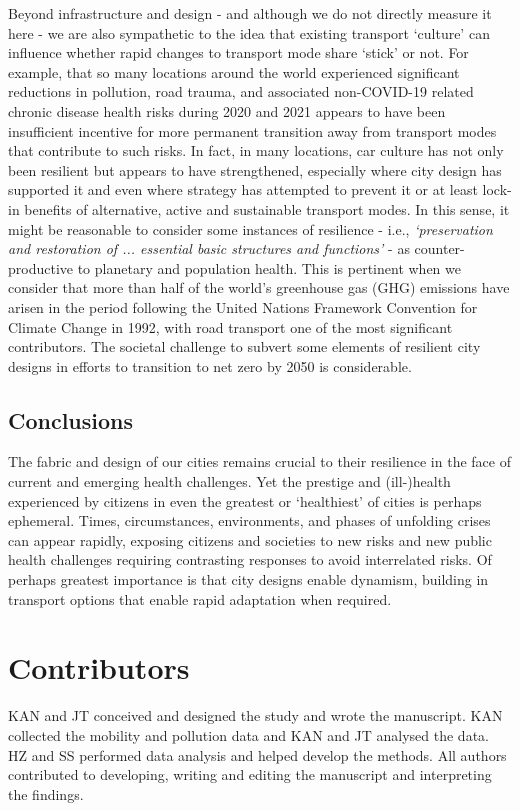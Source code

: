\documentclass[preprint,10pt]{elsarticle} %
\begin{document}
Beyond infrastructure and design - and although we do not directly measure it here - we are also sympathetic to the idea that existing transport `culture' \cite{PATERSON_2000} can influence whether rapid changes to transport mode share `stick' or not. For example, that so many locations around the world experienced significant reductions in pollution, road trauma, and associated non-COVID-19 related chronic disease health risks during 2020 and 2021 appears to have been insufficient incentive for more permanent transition away from transport modes that contribute to such risks. In fact, in many locations, car culture has not only been resilient but appears to have strengthened, especially where city design has supported it and even where strategy has attempted to prevent it or at least lock-in benefits of alternative, active and sustainable transport modes\cite{hunter_city_2024}. In this sense, it might be reasonable to consider some instances of resilience - i.e., \textit{`preservation and restoration of ... essential basic structures and functions'} - as counter-productive to planetary and population health. This is pertinent when we consider that more than half of the world's greenhouse gas (GHG) emissions have arisen in the period following the United Nations Framework Convention for Climate Change in 1992\cite{bashmakov2022climate}, with road transport one of the most significant contributors. The societal challenge to subvert some elements of resilient city designs in efforts to transition to net zero by 2050\cite{lynskey2020moving} is considerable.

\subsection*{Conclusions}

The fabric and design of our cities remains crucial to their resilience in the face of current and emerging health challenges. Yet the prestige and (ill-)health experienced by citizens in even the greatest or `healthiest' of cities is perhaps ephemeral. Times, circumstances, environments, and phases of unfolding crises can appear rapidly, exposing citizens and societies to new risks and new public health challenges requiring contrasting responses to avoid interrelated risks. Of perhaps greatest importance is that city designs enable dynamism, building in transport options that enable rapid adaptation when required.



\section*{Contributors}\label{sec:credit}
KAN and JT conceived and designed the study and wrote the manuscript. KAN collected the mobility and pollution data and KAN and JT analysed the data. HZ and SS performed data analysis and helped develop the methods. All authors contributed to developing, writing and editing the manuscript and interpreting the findings.
\end{document}
